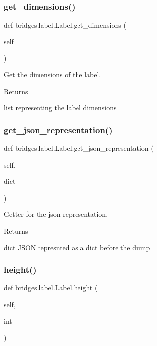 \subsubsection{\texorpdfstring{get\+\_\+dimensions()}{get\_dimensions()}}
{\footnotesize\ttfamily def bridges.\+label.\+Label.\+get\+\_\+dimensions (\begin{DoxyParamCaption}\item[{}]{self }\end{DoxyParamCaption})}



Get the dimensions of the label. 

\begin{DoxyReturn}{Returns}


list representing the label dimensions 
\end{DoxyReturn}
\mbox{\label{classbridges_1_1label_1_1_label_a5075b73938ca71eed43af12f26a71842}} 
\subsubsection{\texorpdfstring{get\+\_\+json\+\_\+representation()}{get\_json\_representation()}}
{\footnotesize\ttfamily def bridges.\+label.\+Label.\+get\+\_\+json\+\_\+representation (\begin{DoxyParamCaption}\item[{}]{self,  }\item[{}]{dict }\end{DoxyParamCaption})}



Getter for the json representation. 

\begin{DoxyReturn}{Returns}


dict J\+S\+ON represnted as a dict before the dump 
\end{DoxyReturn}
\mbox{\label{classbridges_1_1label_1_1_label_a835d7578968142bec34872ad3e757670}} 
\subsubsection{\texorpdfstring{height()}{height()}\hspace{0.1cm}{\footnotesize\ttfamily [1/2]}}
{\footnotesize\ttfamily def bridges.\+label.\+Label.\+height (\begin{DoxyParamCaption}\item[{}]{self,  }\item[{}]{int }\end{DoxyParamCaption})}



